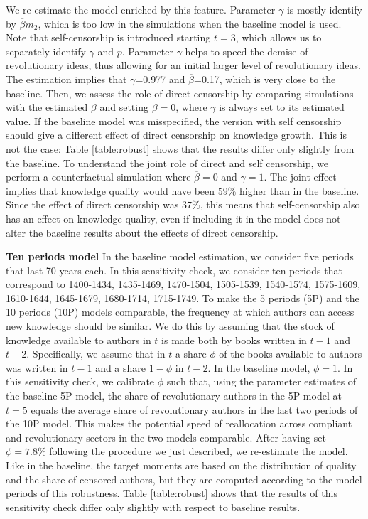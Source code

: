 We re-estimate the model enriched by this feature. Parameter $\gamma$ is mostly identify by $\overline{\beta}m_2$, which is too low in the simulations when the baseline model is used.  Note that self-censorship is introduced starting $t=3$, which allows us to separately identify $\gamma$ and $p$. Parameter $\gamma$ helps to speed the demise of revolutionary ideas, thus allowing for an initial larger level of revolutionary ideas. The estimation implies that $\gamma$=0.977 and $\overline{\beta}$=0.17, which is very close to the baseline. Then, we assess the role of direct censorship by comparing simulations with the estimated $\overline{\beta}$ and setting $\overline{\beta}=0$, where $\gamma$ is always set to its estimated value. If the baseline model was misspecified, the version with self censorship should give a different effect of direct censorship on knowledge growth. This is not the case: Table \ref{table:robust} shows that the results differ only slightly from the baseline. To understand the joint role of direct and self censorship, we perform a counterfactual simulation where $\overline{\beta}=0$ and $\gamma=1$. The joint effect implies that knowledge quality would have been $59\%$ higher than in the baseline. Since the effect of direct censorship was $37\%$, this means that self-censorship also has an effect on knowledge quality, even if including it in the model does not alter the baseline results about the effects of direct censorship.


\textbf{Ten periods model} In the baseline model estimation, we consider five  periods that last 70 years each. In this sensitivity check, we consider ten  periods that correspond to 1400-1434, 1435-1469, 1470-1504, 1505-1539, 1540-1574, 1575-1609, 1610-1644, 1645-1679, 1680-1714, 1715-1749.  To make the 5 periods (5P) and the 10 periods (10P) models comparable, the frequency at which authors can access new knowledge should be similar. We do this by assuming that the stock of knowledge available to authors in $t$ is made both by books written in $t-1$ and $t-2$. Specifically, we assume that in $t$ a share $\phi$ of the books available to authors was written in $t-1$ and a share $1-\phi$ in $t-2$. In the baseline model, $\phi=1$. In this sensitivity check, we calibrate $\phi$ such that, using the parameter estimates of the baseline 5P model, the share of revolutionary authors in the 5P model at $t=5$ equals the average share of revolutionary authors in the last two periods of the 10P model. This makes the potential speed of reallocation across compliant and revolutionary sectors in the two models comparable. After having set $\phi=7.8\%$ following the procedure we just described, we re-estimate the model. Like in the baseline, the target moments are based on the distribution of quality and the share of censored authors, but they are computed according to the model periods of this robustness.   Table \ref{table:robust} shows that the results of this sensitivity check differ only slightly with respect to baseline results.

